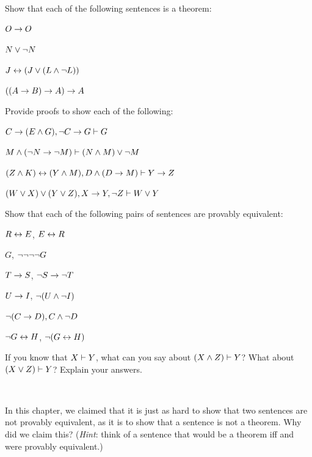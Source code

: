 \begin{practiceproblems}
\problempart
Show that each of the following sentences is a theorem:
\begin{problemslist}
\item $O \rightarrow O$
\item $N \vee \neg N$
\item $J \leftrightarrow (J\vee (L\mathbin{\wedge}\neg L))$
\item $((A \rightarrow B) \rightarrow A) \rightarrow A$
\end{problemslist}

\problempart
Provide proofs to show each of the following:
\begin{problemslist}
\item $C\rightarrow(E\mathbin{\wedge} G), \neg C \rightarrow G \vdash G$
\item $M \mathbin{\wedge} (\neg N \rightarrow \neg M) \vdash (N \mathbin{\wedge} M) \vee \neg M$
\item $(Z\mathbin{\wedge} K)\leftrightarrow(Y\mathbin{\wedge} M), D\mathbin{\wedge}(D\rightarrow M) \vdash Y\rightarrow Z$
\item $(W \vee X) \vee (Y \vee Z), X\rightarrow Y, \neg Z \vdash W\vee Y$
\end{problemslist}

\problempart
Show that each of the following pairs of sentences are provably equivalent:
\begin{problemslist}
\item $R \leftrightarrow E$, $E \leftrightarrow R$
\item $G$, $\neg\neg\neg\neg G$
\item $T\rightarrow S$, $\neg S \rightarrow \neg T$
\item $U \rightarrow I$, $\neg(U \mathbin{\wedge} \neg I)$
\item $\neg (C \rightarrow D), C \mathbin{\wedge} \neg D$
\item $\neg G \leftrightarrow H$, $\neg(G \leftrightarrow H)$
\end{problemslist}

\problempart
If you know that $X\vdash Y$, what can you say about $(X\mathbin{\wedge}Z)\vdash Y$? What about $(X\vee Z)\vdash Y$? Explain your answers.

\

\problempart In this chapter, we claimed that it is just as hard to show that two sentences are not provably equivalent, as it is to show that a sentence is not a theorem. Why did we claim this? (\emph{Hint}: think of a sentence that would be a theorem iff \metaX and \metaY were provably equivalent.)


\end{practiceproblems}
